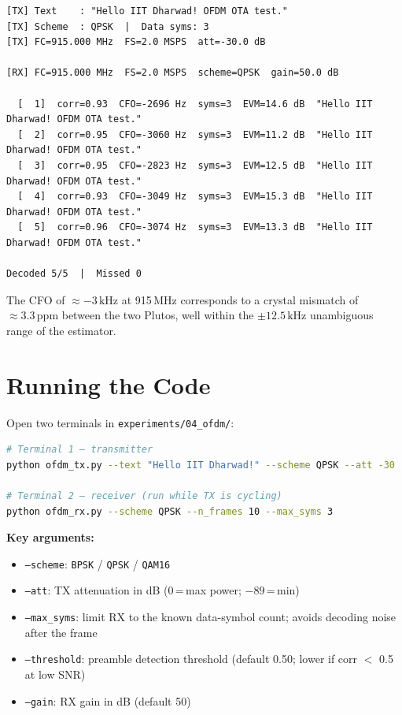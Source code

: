 \documentclass[11pt,a4paper]{article}
\begin{document}
\begin{lstlisting}[language={},basicstyle=\ttfamily\small]
[TX] Text    : "Hello IIT Dharwad! OFDM OTA test."
[TX] Scheme  : QPSK  |  Data syms: 3
[TX] FC=915.000 MHz  FS=2.0 MSPS  att=-30.0 dB

[RX] FC=915.000 MHz  FS=2.0 MSPS  scheme=QPSK  gain=50.0 dB

  [  1]  corr=0.93  CFO=-2696 Hz  syms=3  EVM=14.6 dB  "Hello IIT Dharwad! OFDM OTA test."
  [  2]  corr=0.95  CFO=-3060 Hz  syms=3  EVM=11.2 dB  "Hello IIT Dharwad! OFDM OTA test."
  [  3]  corr=0.95  CFO=-2823 Hz  syms=3  EVM=12.5 dB  "Hello IIT Dharwad! OFDM OTA test."
  [  4]  corr=0.93  CFO=-3049 Hz  syms=3  EVM=15.3 dB  "Hello IIT Dharwad! OFDM OTA test."
  [  5]  corr=0.96  CFO=-3074 Hz  syms=3  EVM=13.3 dB  "Hello IIT Dharwad! OFDM OTA test."

Decoded 5/5  |  Missed 0
\end{lstlisting}

The CFO of $\approx -3\,\text{kHz}$ at 915\,MHz corresponds to a crystal
mismatch of $\approx 3.3\,\text{ppm}$ between the two Plutos, well within
the $\pm 12.5\,\text{kHz}$ unambiguous range of the estimator.

\section{Running the Code}

Open two terminals in \texttt{experiments/04\_ofdm/}:

\begin{lstlisting}[language=bash]
# Terminal 1 — transmitter
python ofdm_tx.py --text "Hello IIT Dharwad!" --scheme QPSK --att -30

# Terminal 2 — receiver (run while TX is cycling)
python ofdm_rx.py --scheme QPSK --n_frames 10 --max_syms 3
\end{lstlisting}

\textbf{Key arguments:}
\begin{itemize}
  \item \texttt{--scheme}: \texttt{BPSK} / \texttt{QPSK} / \texttt{QAM16}
  \item \texttt{--att}: TX attenuation in dB (0\,=\,max power; $-89$\,=\,min)
  \item \texttt{--max\_syms}: limit RX to the known data-symbol count; avoids decoding noise after the frame
  \item \texttt{--threshold}: preamble detection threshold (default 0.50; lower if corr $<$ 0.5 at low SNR)
  \item \texttt{--gain}: RX gain in dB (default 50)
\end{itemize}
\end{document}
